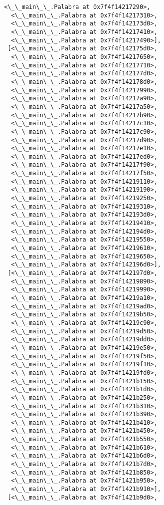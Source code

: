 \documentclass[12pt,a4paper,table]{article}
\begin{document}
\begin{tcolorbox}[breakable, size=fbox, boxrule=.5pt, pad at break*=1mm, opacityfill=0]
\begin{Verbatim}[commandchars=\\\{\}]
  <\_\_main\_\_.Palabra at 0x7f4f14217290>,
  <\_\_main\_\_.Palabra at 0x7f4f14217310>,
  <\_\_main\_\_.Palabra at 0x7f4f142173d0>,
  <\_\_main\_\_.Palabra at 0x7f4f14217410>,
  <\_\_main\_\_.Palabra at 0x7f4f14217490>],
 [<\_\_main\_\_.Palabra at 0x7f4f142175d0>,
  <\_\_main\_\_.Palabra at 0x7f4f14217650>,
  <\_\_main\_\_.Palabra at 0x7f4f14217710>,
  <\_\_main\_\_.Palabra at 0x7f4f142177d0>,
  <\_\_main\_\_.Palabra at 0x7f4f142178d0>,
  <\_\_main\_\_.Palabra at 0x7f4f14217990>,
  <\_\_main\_\_.Palabra at 0x7f4f14217a90>,
  <\_\_main\_\_.Palabra at 0x7f4f14217a50>,
  <\_\_main\_\_.Palabra at 0x7f4f14217b90>,
  <\_\_main\_\_.Palabra at 0x7f4f14217c10>,
  <\_\_main\_\_.Palabra at 0x7f4f14217c90>,
  <\_\_main\_\_.Palabra at 0x7f4f14217d90>,
  <\_\_main\_\_.Palabra at 0x7f4f14217e10>,
  <\_\_main\_\_.Palabra at 0x7f4f14217ed0>,
  <\_\_main\_\_.Palabra at 0x7f4f14217f90>,
  <\_\_main\_\_.Palabra at 0x7f4f14217f50>,
  <\_\_main\_\_.Palabra at 0x7f4f14219110>,
  <\_\_main\_\_.Palabra at 0x7f4f14219190>,
  <\_\_main\_\_.Palabra at 0x7f4f14219250>,
  <\_\_main\_\_.Palabra at 0x7f4f14219310>,
  <\_\_main\_\_.Palabra at 0x7f4f142193d0>,
  <\_\_main\_\_.Palabra at 0x7f4f14219410>,
  <\_\_main\_\_.Palabra at 0x7f4f142194d0>,
  <\_\_main\_\_.Palabra at 0x7f4f14219550>,
  <\_\_main\_\_.Palabra at 0x7f4f14219610>,
  <\_\_main\_\_.Palabra at 0x7f4f14219650>,
  <\_\_main\_\_.Palabra at 0x7f4f142196d0>],
 [<\_\_main\_\_.Palabra at 0x7f4f142197d0>,
  <\_\_main\_\_.Palabra at 0x7f4f14219890>,
  <\_\_main\_\_.Palabra at 0x7f4f14219990>,
  <\_\_main\_\_.Palabra at 0x7f4f14219a10>,
  <\_\_main\_\_.Palabra at 0x7f4f14219ad0>,
  <\_\_main\_\_.Palabra at 0x7f4f14219b50>,
  <\_\_main\_\_.Palabra at 0x7f4f14219c90>,
  <\_\_main\_\_.Palabra at 0x7f4f14219d50>,
  <\_\_main\_\_.Palabra at 0x7f4f14219dd0>,
  <\_\_main\_\_.Palabra at 0x7f4f14219e50>,
  <\_\_main\_\_.Palabra at 0x7f4f14219f50>,
  <\_\_main\_\_.Palabra at 0x7f4f14219f10>,
  <\_\_main\_\_.Palabra at 0x7f4f14219fd0>,
  <\_\_main\_\_.Palabra at 0x7f4f1421b150>,
  <\_\_main\_\_.Palabra at 0x7f4f1421b1d0>,
  <\_\_main\_\_.Palabra at 0x7f4f1421b250>,
  <\_\_main\_\_.Palabra at 0x7f4f1421b310>,
  <\_\_main\_\_.Palabra at 0x7f4f1421b390>,
  <\_\_main\_\_.Palabra at 0x7f4f1421b410>,
  <\_\_main\_\_.Palabra at 0x7f4f1421b450>,
  <\_\_main\_\_.Palabra at 0x7f4f1421b550>,
  <\_\_main\_\_.Palabra at 0x7f4f1421b610>,
  <\_\_main\_\_.Palabra at 0x7f4f1421b6d0>,
  <\_\_main\_\_.Palabra at 0x7f4f1421b7d0>,
  <\_\_main\_\_.Palabra at 0x7f4f1421b850>,
  <\_\_main\_\_.Palabra at 0x7f4f1421b950>,
  <\_\_main\_\_.Palabra at 0x7f4f1421b910>],
 [<\_\_main\_\_.Palabra at 0x7f4f1421b9d0>,

\end{Verbatim}
\end{tcolorbox}
\end{document}
